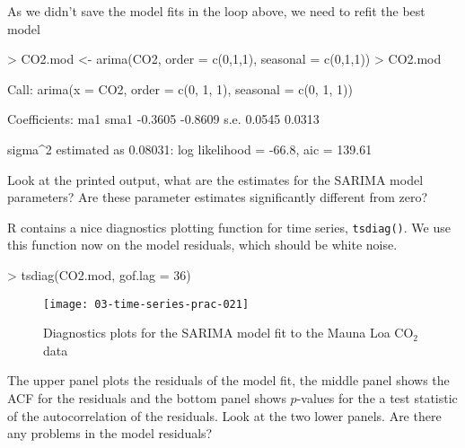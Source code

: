 \documentclass[a4paper,10pt]{article}
\newcommand{\R}{\textsf{R}\xspace}
\begin{document}
As we didn't save the model fits in the loop above, we need to refit the best model
\begin{Schunk}
\begin{Sinput}
> CO2.mod <- arima(CO2, order = c(0,1,1), seasonal = c(0,1,1))
> CO2.mod
\end{Sinput}
\begin{Soutput}
Call:
arima(x = CO2, order = c(0, 1, 1), seasonal = c(0, 1, 1))

Coefficients:
          ma1     sma1
      -0.3605  -0.8609
s.e.   0.0545   0.0313

sigma^2 estimated as 0.08031:  log likelihood = -66.8,  aic = 139.61
\end{Soutput}
\end{Schunk}
Look at the printed output, what are the estimates for the SARIMA model parameters? Are these parameter estimates significantly different from zero?

\R contains a nice diagnostics plotting function for time series, \texttt{tsdiag()}. We use this function now on the model residuals, which should be white noise.
\begin{Schunk}
\begin{Sinput}
> tsdiag(CO2.mod, gof.lag = 36)
\end{Sinput}
\end{Schunk}

\begin{figure}[t]
\begin{center}
\texttt{[image: 03-time-series-prac-021]}
\caption{Diagnostics plots for the SARIMA model fit to the Mauna Loa $\mathrm{CO_2}$ data}
\end{center}
\end{figure}
The upper panel plots the residuals of the model fit, the middle panel shows the ACF for the residuals and the bottom panel shows $p$-values for the a test statistic of the autocorrelation of the residuals. Look at the two lower panels. Are there any problems in the model residuals?
\end{document}

